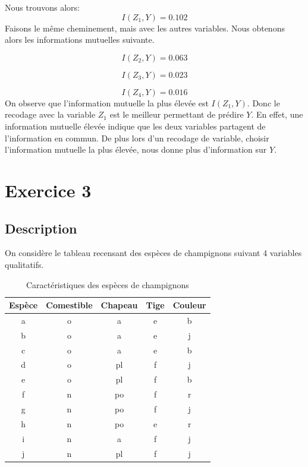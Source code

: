 \documentclass{article}
\begin{document}
Nous trouvons alors:
\[
  I(Z_1, Y)= 0.102
\]
Faisons le même cheminement, mais avec les autres variables. Nous obtenons alors les informations mutuelles suivante.

\[
I(Z_2,Y) = 0.063
\]

\[
I(Z_3,Y) = 0.023
\]

\[
I(Z_4,Y) = 0.016
\]
On observe que l'information mutuelle la plus élevée est $I(Z_1,Y)$. Donc le recodage avec la variable $Z_1$ est le meilleur permettant de prédire $Y$. En effet, une information mutuelle élevée indique que les deux variables partagent de l'information en commun. De plus lors d'un recodage de variable, choisir l'information mutuelle la plus élevée, nous donne plus d'information sur $Y$.


\newpage
\section{Exercice 3}
\label{exercice3}
\subsection{Description}

On considère le tableau recensant des espèces de champignons suivant 4 variables qualitatifs. 

\begin{table}[h]
  \centering
  \caption{Caractéristiques des espèces de champignons}
  \begin{tabular}{@{}ccccc@{}}
  \toprule
  Espèce & Comestible & Chapeau & Tige & Couleur \\ \midrule
  a      & o          & a       & e    & b       \\
  b      & o          & a       & e    & j       \\
  c      & o          & a       & e    & b       \\
  d      & o          & pl      & f    & j       \\
  e      & o          & pl      & f    & b       \\
  f      & n          & po      & f    & r       \\
  g      & n          & po      & f    & j       \\
  h      & n          & po      & e    & r       \\
  i      & n          & a       & f    & j       \\
  j      & n          & pl      & f    & j       \\ \bottomrule
  \end{tabular}
  
  \label{tab:champignons}
  \end{table}
\end{document}
